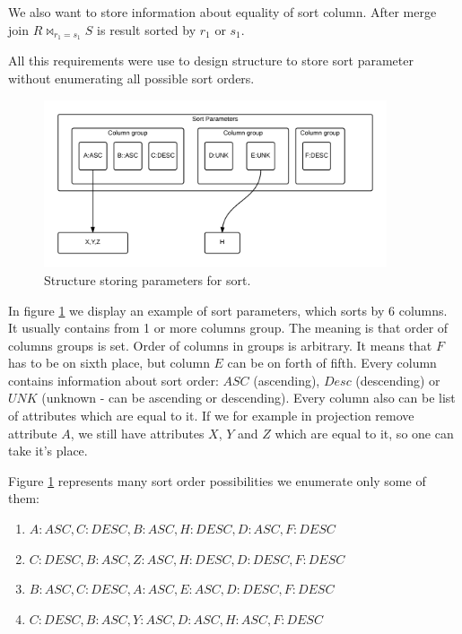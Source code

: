 We also want to store information about equality of sort column. After merge join $R\Join_{r_1=s_1} S$ is result sorted by $r_1$ or $s_1$.

All this requirements were use to design structure to store sort parameter without enumerating all possible sort orders.

\begin{figure}[h!]
  \centering
    \includegraphics[width=0.9\textwidth]{sortparameters}

      \caption{Structure storing parameters for sort.}
          \label{fig:sortparameters}
\end{figure}

In figure \ref{fig:sortparameters} we display an example of sort parameters, which sorts by 6 columns. It usually contains from 1 or more columns group. The meaning is that order of columns groups is set. Order of columns in groups is arbitrary. It means that $F$ has to be on sixth place, but column $E$ can be on forth of fifth. Every column contains information about sort order: $ASC$ (ascending), $Desc$ (descending) or $UNK$ (unknown - can be ascending or descending). Every column also can be list of attributes which are equal to it. If we for example in projection remove attribute $A$, we still have attributes $X$, $Y$ and $Z$ which are equal to it, so one can take it's place.

Figure \ref{fig:sortparameters} represents many sort order possibilities we enumerate only some of them:
\begin{enumerate}
\item $A:ASC,C:DESC,B:ASC,H:DESC,D:ASC,F:DESC$
\item $C:DESC,B:ASC,Z:ASC,H:DESC,D:DESC,F:DESC$
\item $B:ASC,C:DESC,A:ASC,E:ASC,D:DESC,F:DESC$
\item $C:DESC,B:ASC,Y:ASC,D:ASC,H:ASC,F:DESC$
\end{enumerate}



